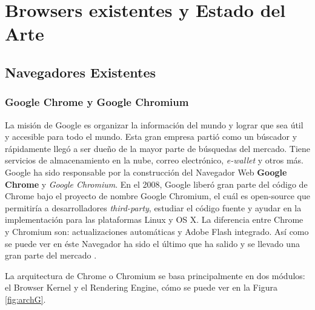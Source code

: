 \chapter{Browsers existentes y Estado del Arte} %
\label{chap3:EA}
\section{Navegadores Existentes}
\label{chap3:BrowExis}

    \subsection{Google Chrome y Google Chromium}
    \label{chap3:GC}
    La misión de Google es organizar la información del mundo y lograr que sea útil y accesible para todo el mundo. Esta gran empresa partió como un búscador y rápidamente llegó a ser dueño de la mayor parte de búsquedas del mercado. Tiene servicios de almacenamiento en la nube, correo electrónico, \textit{e-wallet} y otros más. Google ha sido responsable por la construcción del Navegador Web \textbf{Google Chrome} y \textit{Google Chromium}. En el 2008, Google liberó gran parte del código de Chrome bajo el proyecto de nombre Google Chromium, el cuál es open-source que permitiría a desarrolladores \textit{third-party}, estudiar el código fuente y ayudar en la implementación para las plataformas Linux y OS X. La diferencia entre Chrome y Chromium son: actualizaciones automáticas y Adobe Flash integrado. Así como se puede ver en \cite{EvolutionofWeb} éste Navegador ha sido el último que ha salido y se llevado una gran parte del mercado \cite{statBrow}.

    La arquitectura de Chrome o Chromium se basa principalmente en dos módulos: el Browser Kernel y el Rendering Engine, cómo se puede ver en la Figura \ref{fig:archG}.

